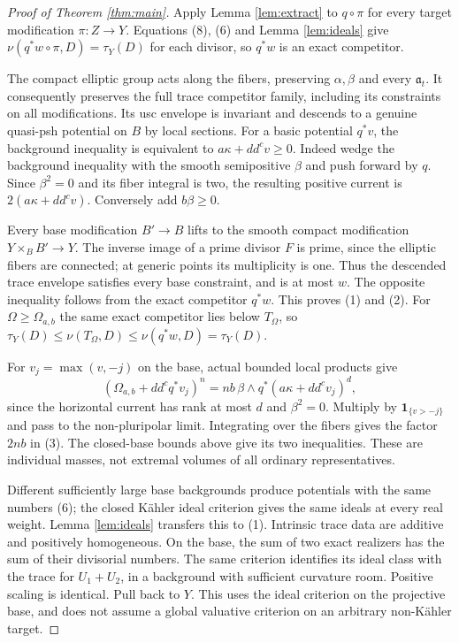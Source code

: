 \documentclass[11pt]{article}
\newcommand{\ddc}{dd^c}
\theoremstyle{remark}\newtheorem{remark}[theorem]{Remark}
\begin{document}
\begin{proof}[Proof of Theorem \ref{thm:main}]
Apply Lemma \ref{lem:extract} to $q\circ\pi$ for every target
modification $\pi:Z\to Y$. Equations (8), (6) and Lemma
\ref{lem:ideals} give
$\nu(q^*w\circ\pi,D)=\tau_Y(D)$ for each divisor, so $q^*w$ is
an exact competitor.

The compact elliptic group acts along the fibers, preserving
$\alpha,\beta$ and every $\mathfrak a_t$. It consequently preserves
the full trace competitor family, including its constraints on all
modifications. Its usc envelope is invariant and descends to a
genuine quasi-psh potential on $B$ by local sections. For a basic
potential $q^*v$, the background inequality is equivalent to
$a\kappa+\ddc v\ge0$. Indeed wedge the background inequality
with the smooth semipositive $\beta$ and push forward by $q$.
Since $\beta^2=0$ and its fiber integral is two, the resulting
positive current is $2(a\kappa+\ddc v)$. Conversely add $b\beta\ge0$.

Every base modification $B'\to B$ lifts to the smooth compact
modification $Y\times_B B'\to Y$. The inverse image of a prime divisor
$F$ is prime, since the elliptic fibers are connected; at generic
points its multiplicity is one. Thus the descended trace envelope
satisfies every base constraint, and is at most $w$. The opposite
inequality follows from the exact competitor $q^*w$. This proves
(1) and (2). For $\Omega\ge\Omega_{a,b}$ the same exact competitor
lies below $T_\Omega$, so
$\tau_Y(D)\le\nu(T_\Omega,D)\le\nu(q^*w,D)=\tau_Y(D)$.

For $v_j=\max(v,-j)$ on the base, actual bounded local products give
\[
 (\Omega_{a,b}+\ddc q^*v_j)^n
   =nb\,\beta\wedge q^*(a\kappa+\ddc v_j)^d,
\]
since the horizontal current has rank at most $d$ and $\beta^2=0$.
Multiply by $\mathbf1_{\{v>-j\}}$ and pass to the non-pluripolar
limit. Integrating over the fibers gives the factor $2nb$ in (3).
The closed-base bounds above give its two inequalities.
These are individual masses, not extremal volumes of all ordinary
representatives.

Different sufficiently large base backgrounds produce potentials
with the same numbers (6); the closed K\"ahler ideal criterion
\cite[Proposition 3.2.1]{SGPT} gives the same ideals at every real
weight. Lemma \ref{lem:ideals} transfers this to (1).
Intrinsic trace data are additive and positively homogeneous.
On the base, the sum of two exact realizers has the sum of their
divisorial numbers. The same criterion identifies its ideal class
with the trace for $U_1+U_2$, in a background with sufficient
curvature room. Positive scaling is identical. Pull back to $Y$.
This uses the ideal criterion on the projective base, and does not
assume a global valuative criterion on an arbitrary non-K\"ahler target.
\end{proof}
\end{document}
